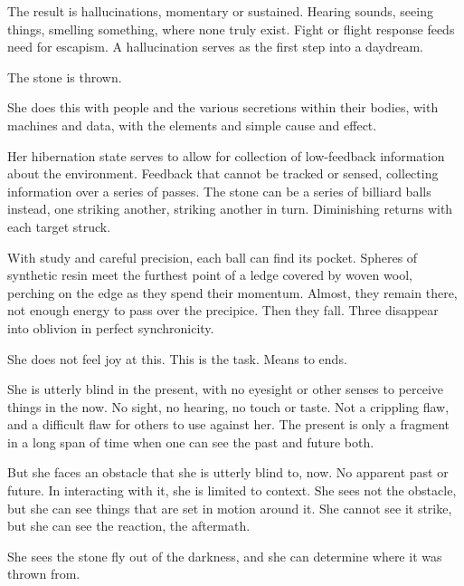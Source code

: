 The result is hallucinations, momentary or sustained.  Hearing sounds, seeing things, smelling something, where none truly exist.  Fight or flight response feeds need for escapism.  A hallucination serves as the first step into a daydream.



The stone is thrown.



She does this with people and the various secretions within their bodies, with machines and data, with the elements and simple cause and effect.



Her hibernation state serves to allow for collection of low-feedback information about the environment.  Feedback that cannot be tracked or sensed, collecting information over a series of passes.  The stone can be a series of billiard balls instead, one striking another, striking another in turn.  Diminishing returns with each target struck.



With study and careful precision, each ball can find its pocket.  Spheres of synthetic resin meet the furthest point of a ledge covered by woven wool, perching on the edge as they spend their momentum.  Almost, they remain there, not enough energy to pass over the precipice.  Then they fall.  Three disappear into oblivion in perfect synchronicity.



She does not feel joy at this.  This is the task.  Means to ends.



She is utterly blind in the present, with no eyesight or other senses to perceive things in the now.  No sight, no hearing, no touch or taste.  Not a crippling flaw, and a difficult flaw for others to use against her.  The present is only a fragment in a long span of time when one can see the past and future both.



But she faces an obstacle that she is utterly blind to, now.  No apparent past or future.  In interacting with it, she is limited to context.  She sees not the obstacle, but she can see things that are set in motion around it.  She cannot see it strike, but she can see the reaction, the aftermath.



She sees the stone fly out of the darkness, and she can determine where it was thrown from.



